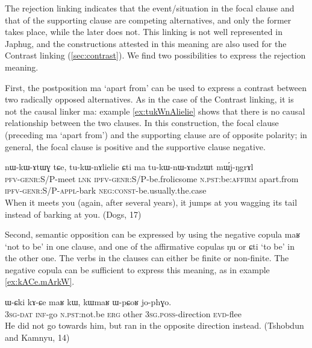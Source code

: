 \documentclass[oldfontcommands,oneside,a4paper,11pt]{article}
\newcommand{\ipa}[1]{{\phon \mbox{#1}}} %
\begin{document}
The rejection linking indicates that the event/situation in the focal clause and that of the supporting clause are competing alternatives, and only the former takes place, while the later  does not. This linking is not well represented in Japhug, and the constructions attested in this meaning are also used for the Contrast linking (\ref{sec:contrast}). We find two possibilities to express the rejection meaning.

First, the postposition \ipa{ma} `apart from'  can be used to express a contrast between two radically opposed alternatives.  As in the case of the Contrast linking, it is not the causal linker \ipa{ma}: example \ref{ex:tukWnAlielie} shows that there is no causal relationship between the two clauses. In this construction, the focal clause (preceding  \ipa{ma} `apart from') and the supporting clause are of opposite polarity; in general, the focal clause is positive and the supportive clause negative.



\begin{exe}
\ex \label{ex:tukWnAlielie}
\gll
\ipa{nɯ-kɯ-ɤtɯɣ}  	\ipa{tɕe,}  	\ipa{tu-kɯ-nɤlielie}  	\ipa{ɕti}  	\ipa{ma}  	\ipa{tu-kɯ-nɯ-ɤndzɯt}  	\ipa{mɯ́j-ŋgrɤl}  	\\
\textsc{pfv-genr:S/P}-meet \textsc{lnk} \textsc{ipfv-genr:S/P}-be.frolicsome \textsc{n.pst}:be:\textsc{affirm}  apart.from \textsc{ipfv-genr:S/P}-\textsc{appl}-bark \textsc{neg:const}-be.usually.the.case \\
\glt When it meets you (again, after several years), it jumps at you wagging its tail instead of barking at you.  (Dogs, 17)
\end{exe}
 
Second, semantic opposition can be expressed by using the negative copula \ipa{maʁ} `not to be' in one clause, and one of the affirmative copulas \ipa{ŋu} or \ipa{ɕti} `to be' in the other one. The verbs in the clauses can either be finite or non-finite. The negative copula can be sufficient to express this meaning, as in example \ref{ex:kACe.mArkW}.

\begin{exe}
\ex \label{ex:kACe.mArkW}
\gll
\ipa{ɯ-ɕki}  	\ipa{kɤ-ɕe}  	\ipa{maʁ}  	\ipa{kɯ,}  	\ipa{kɯmaʁ}  	\ipa{ɯ-pɕoʁ}  	\ipa{jo-phɣo.}  \\
\textsc{3sg-dat} \textsc{inf}-go \textsc{n.pst}:not.be \textsc{erg} other \textsc{3sg.poss}-direction \textsc{evd}-flee \\
 \glt He did not go towards him, but ran in the opposite direction instead. (Tshobdun and Kamnyu, 14)
\end{exe}
 
\end{document}
